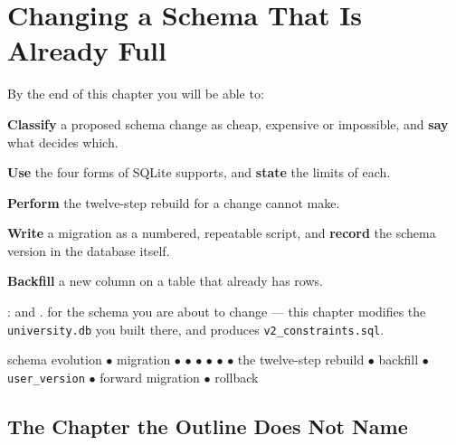 \chapter{Changing a Schema That Is Already Full}\label{ch:evolution}

\begin{outcomes}
By the end of this chapter you will be able to:
\begin{tight}
  \item \textbf{Classify} a proposed schema change as cheap, expensive or
        impossible, and \textbf{say} what decides which.
  \item \textbf{Use} the four forms of  SQLite supports, and
        \textbf{state} the limits of each.
  \item \textbf{Perform} the twelve-step rebuild for a change
         cannot make.
  \item \textbf{Write} a migration as a numbered, repeatable script, and
        \textbf{record} the schema version in the database itself.
  \item \textbf{Backfill} a new  column on a table that already
        has rows.
\end{tight}
\end{outcomes}

\begin{prereq}
:  and .  for the
schema you are about to change --- this chapter modifies the
\texttt{university.db} you built there, and produces
\texttt{v2\_constraints.sql}.
\end{prereq}

\begin{keyterms}
schema evolution $\bullet$ migration $\bullet$  $\bullet$
 $\bullet$  $\bullet$ 
$\bullet$  $\bullet$ the twelve-step rebuild $\bullet$
backfill $\bullet$  \texttt{user\_version} $\bullet$
forward migration $\bullet$ rollback
\end{keyterms}

\section{The Chapter the Outline Does Not Name}

